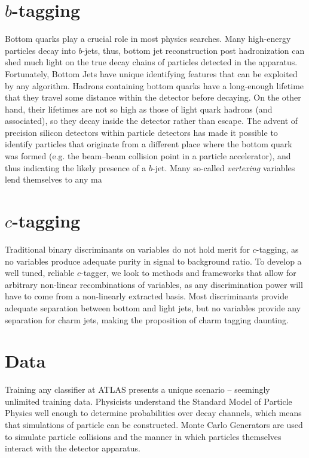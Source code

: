 \section{$b$-tagging}

Bottom quarks play a crucial role in most physics searches. Many high-energy particles decay into $b$-jets, thus, bottom jet reconstruction post hadronization can shed much light on the true decay chains of particles detected in the apparatus. Fortunately, Bottom Jets have unique identifying features that can be exploited by any algorithm. Hadrons containing bottom quarks have a long-enough lifetime that they travel some distance within the detector before decaying. On the other hand, their lifetimes are not so high as those of light quark hadrons (and associated), so they decay inside the detector rather than escape. The advent of precision silicon detectors within particle detectors has made it possible to identify particles that originate from a different place where the bottom quark was formed (e.g. the beam–beam collision point in a particle accelerator), and thus indicating the likely presence of a $b$-jet. Many so-called \textit{vertexing} variables lend themselves to any ma

\section{$c$-tagging}

Traditional binary discriminants on variables do not hold merit for $c$-tagging, as no variables produce adequate purity in signal to background ratio. To develop a well tuned, reliable $c$-tagger, we look to methods and frameworks that allow for arbitrary non-linear recombinations of variables, as any discrimination power will have to come from a non-linearly extracted basis. Most discriminants provide adequate separation between bottom and light jets, but no variables provide any separation for charm jets, making the proposition of charm tagging daunting.\\


\section{Data}
Training any classifier at ATLAS presents a unique scenario -- seemingly unlimited training data. Physicists understand the Standard Model of Particle Physics well enough to determine probabilities over decay channels, which means that simulations of particle can be constructed. Monte Carlo Generators are used to simulate particle collisions and the manner in which particles themselves interact with the detector apparatus. 

